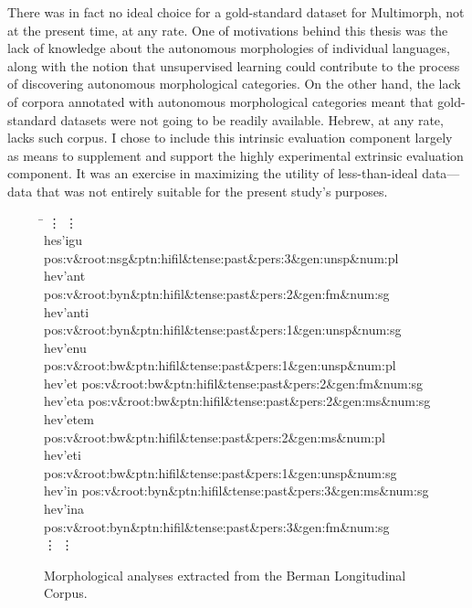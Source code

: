 There was in fact no ideal choice for a gold-standard dataset for Multimorph, 
not at the present time, at any rate. One of motivations behind this 
thesis was the lack of knowledge about the autonomous morphologies 
of individual languages, along with the notion that unsupervised learning could contribute to the 
process of discovering autonomous morphological categories. On the other hand, the lack
of corpora annotated with autonomous morphological categories meant 
that gold-standard datasets were not going to be readily available. Hebrew, at any rate,
lacks such corpus. 
I chose to include this intrinsic evaluation component largely as means 
to supplement and support the highly experimental extrinsic evaluation 
component.  It was an exercise in maximizing the utility of less-than-ideal 
data---data that was not entirely
suitable for the present study's purposes.

\begin{figure}[t]
\begin{mdframed}
\begin{tabbing}
\hspace{1in} \= \hspace{5.5in} \kill
\vdots \> \vdots \\
hes\a'{i}gu \> pos:v\&root:nsg\&ptn:hifil\&tense:past\&pers:3\&gen:unsp\&num:pl \\
hev\a'{a}nt \> pos:v\&root:byn\&ptn:hifil\&tense:past\&pers:2\&gen:fm\&num:sg \\
hev\a'{a}nti \> pos:v\&root:byn\&ptn:hifil\&tense:past\&pers:1\&gen:unsp\&num:sg \\
hev\a'{e}nu \> pos:v\&root:bw\&ptn:hifil\&tense:past\&pers:1\&gen:unsp\&num:pl \\
hev\a'{e}t \> pos:v\&root:bw\&ptn:hifil\&tense:past\&pers:2\&gen:fm\&num:sg \\
hev\a'{e}ta \> pos:v\&root:bw\&ptn:hifil\&tense:past\&pers:2\&gen:ms\&num:sg \\
hev\a'{e}tem \> pos:v\&root:bw\&ptn:hifil\&tense:past\&pers:2\&gen:ms\&num:pl \\
hev\a'{e}ti \> pos:v\&root:bw\&ptn:hifil\&tense:past\&pers:1\&gen:unsp\&num:sg \\
hev\a'{i}n \> pos:v\&root:byn\&ptn:hifil\&tense:past\&pers:3\&gen:ms\&num:sg \\
hev\a'{i}na \> pos:v\&root:byn\&ptn:hifil\&tense:past\&pers:3\&gen:fm\&num:sg \\
\vdots \> \vdots \\
\end{tabbing}
\label{fig:verb-analyses}
\caption{Morphological analyses extracted from the Berman Longitudinal Corpus.}
\end{mdframed}
\end{figure}


